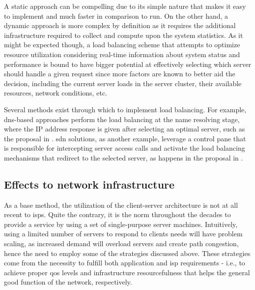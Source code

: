     A static approach can be compelling due to its simple nature that makes it easy to implement and much faster in comparison to run.
    On the other hand, a dynamic approach is more complex by definition as it requires the additional infrastructure required to collect and compute upon the system statistics.
    As it might be expected though, a load balancing scheme that attempts to optimize resource utilization considering real-time information about system status and performance is bound to have bigger potential at effectively selecting which server should handle a given request since more factors are known to better aid the decision, including the current server loads in the server cluster, their available resources, network conditions, etc.

    Several methods exist through which to implement load balancing.
    For example, \gls{dns}-based approaches perform the load balancing at the name resolving stage, where the IP address response is given after selecting an optimal server, such as the proposal in \cite{dns-load-balancing}.
    \gls{sdn} solutions, as another example, leverage a control pane that is responsible for intercepting server access calls and activate the load balancing mechanisms that redirect to the selected server, as happens in the proposal in \cite{sdn-load-balancing}.


\subsection{Effects to network infrastructure}

    As a base method, the utilization of the client-server architecture is not at all recent to \glspl{isp}.
    Quite the contrary, it is the norm throughout the decades to provide a service by using a set of single-purpose server machines.
    Intuitively, using a limited number of servers to respond to clients needs will have problem scaling, as increased demand will overload servers and create path congestion, hence the need to employ some of the strategies discussed above.
    These strategies come from the necessity to fulfill both application and \gls{isp} requirements - i.e., to achieve proper \gls{qos} levels and infrastructure resourcefulness that helps the general good function of the network, respectively.

